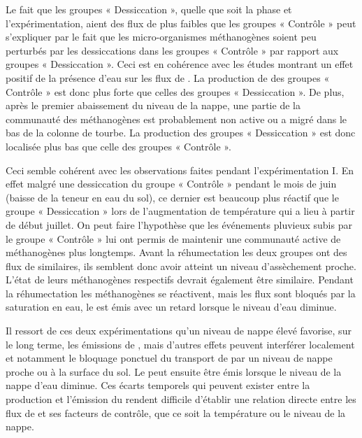 Le fait que les groupes « Dessiccation », quelle que soit la phase et l'expérimentation, aient des flux de \chh plus faibles que les groupes « Contrôle » peut s'expliquer par le fait que les micro-organismes méthanogènes soient peu perturbés par les dessiccations dans les groupes « Contrôle » par rapport aux groupes « Dessiccation ».
Ceci est en cohérence avec les études montrant un effet positif de la présence d'eau sur les flux de \chh.
La production de \chh des groupes « Contrôle » est donc plus forte que celles des groupes « Dessiccation ».
De plus, après le premier abaissement du niveau de la nappe, une partie de la communauté des méthanogènes est probablement non active ou a migré dans le bas de la colonne de tourbe.
La production des groupes « Dessiccation » est donc localisée plus bas que celle des groupes « Contrôle ».

Ceci semble cohérent avec les observations faites pendant l'expérimentation I.
En effet malgré une dessiccation du groupe « Contrôle » pendant le mois de juin (baisse de la teneur en eau du sol), ce dernier est beaucoup plus réactif que le groupe « Dessiccation » lors de l'augmentation de température qui a lieu à partir de début juillet.
On peut faire l'hypothèse que les événements pluvieux subis par le groupe « Contrôle » lui ont permis de maintenir une communauté active de méthanogènes plus longtemps.
Avant la réhumectation les deux groupes ont des flux de \chh similaires, ils semblent donc avoir atteint un niveau d'assèchement proche.
L'état de leurs méthanogènes respectifs devrait également être similaire.
Pendant la réhumectation les méthanogènes se réactivent, mais les flux sont bloqués par la saturation en eau, le \chh est émis avec un retard lorsque le niveau d'eau diminue.

Il ressort de ces deux expérimentations qu'un niveau de nappe élevé favorise, sur le long terme, les émissions de \chh, mais d'autres effets peuvent interférer localement et notamment le bloquage ponctuel du transport de \chh par un niveau de nappe proche ou à la surface du sol.
Le \chh peut ensuite être émis lorsque le niveau de la nappe d'eau diminue.
Ces écarts temporels qui peuvent exister entre la production et l'émission du \chh rendent difficile d'établir une relation directe entre les flux de \chh et ses facteurs de contrôle, que ce soit la température ou le niveau de la nappe.


